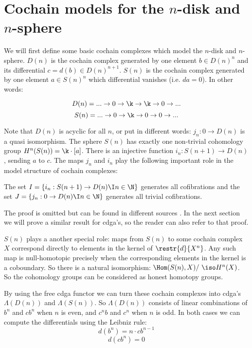 
\section{Cochain models for the \texorpdfstring{$n$}{n}-disk and \texorpdfstring{$n$}{n}-sphere}
\label{sec:cdga-basic-examples}

We will first define some basic cochain complexes which model the $n$-disk and $n$-sphere. $D(n)$ is the cochain complex generated by one element $b \in D(n)^n$ and its differential $c = d(b) \in D(n)^{n+1}$. $S(n)$ is the cochain complex generated by one element $a \in S(n)^n$ which differential vanishes (i.e. $da = 0$). In other words:

$$ D(n) = ... \to 0 \to \k \to \k \to 0 \to ... $$
$$ S(n) = ... \to 0 \to \k \to 0 \to 0 \to ... $$

Note that $D(n)$ is acyclic for all $n$, or put in different words: $j_n : 0 \to D(n)$ is a quasi isomorphism. The sphere $S(n)$ has exactly one non-trivial cohomology group $H^n(S(n)) = \k \cdot [a]$. There is an injective function $i_n : S(n+1) \to D(n)$, sending $a$ to $c$. The maps $j_n$ and $i_n$ play the following important role in the model structure of cochain complexes:

\begin{claim}
	The set $I = \{i_n : S(n+1) \to D(n) \I n \in \N\}$ generates all cofibrations and the set $J = \{j_n : 0 \to D(n) \I n \in \N\}$ generates all trivial cofibrations.
\end{claim}

The proof is omitted but can be found in different sources . In the next section we will prove a similar result for cdga's, so the reader can also refer to that proof.

$S(n)$ plays a another special role: maps from $S(n)$ to some cochain complex $X$ correspond directly to elements in the kernel of $\restr{d}{X^n}$. Any such map is null-homotopic precisely when the corresponding elements in the kernel is a coboundary. So there is a natural isomorphism: $\Hom(S(n), X) / ~ \iso H^n(X)$. So the cohomology groups can be considered as honest homotopy groups.

By using the free cdga functor we can turn these cochain complexes into cdga's $\Lambda(D(n))$ and $\Lambda(S(n))$. So $\Lambda(D(n))$ consists of linear combinations of $b^n$ and $c b^n$ when $n$ is even, and $c^n b$ and $c^n$ when $n$ is odd. In both cases we can compute the differentials using the Leibniz rule:
$$ d(b^n) = n \cdot c b^{n-1} $$
$$ d(c b^n) = 0 $$

